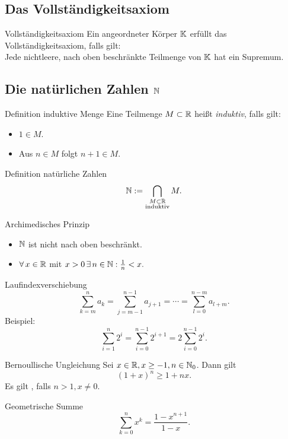 \documentclass[main.tex]{subfiles}
\begin{document}
\subsection*{Das Vollständigkeitsaxiom}
\begin{karte}{Vollständigkeitsaxiom}
    Ein angeordneter Körper \( \mathbb{K} \) erfüllt das Vollständigkeitsaxiom, falls gilt:\\
    Jede nichtleere, nach oben beschränkte Teilmenge von \( \mathbb{K} \) hat ein Supremum.
\end{karte}
\subsection*{Die natürlichen Zahlen \( \mathbb{N} \)}
\begin{karte}{Definition induktive Menge}
    Eine Teilmenge \( M \subset \mathbb{R} \) heißt \textit{induktiv}, falls gilt:
    \begin{itemize}
        \item \( 1 \in M \).
        \item Aus \( n \in M \) folgt \( n + 1 \in M \).
    \end{itemize}
\end{karte}
\begin{karte}{Definition natürliche Zahlen}
    \[ \mathbb{N} := \bigcap_{\substack{M\subset \mathbb{R} \\ \text{induktiv}}} M. \]
\end{karte}
\begin{karte}{Archimedisches Prinzip}
    \begin{itemize}
        \item \( \mathbb{N} \) ist nicht nach oben beschränkt.
        \item \( \forall x \in \R \) mit \( x > 0 \, \exists n \in \N: \frac{1}{n} < x. \)
    \end{itemize}
\end{karte}
\begin{karte}{Laufindexverschiebung}
    \[ \sum_{k=m}^n a_k = \sum_{j=m-1}^{n-1} a_{j+1} = \cdots = \sum_{l=0}^{n-m} a_{l+m}. \]
    Beispiel:
    \[ \sum_{i=1}^n 2^i = \sum_{i=0}^{n-1} 2^{i+1} = 2\sum_{i=0}^{n-1} 2^i. \]
\end{karte}
\begin{karte}{Bernoullische Ungleichung}
    Sei \( x \in \mathbb{R}, x \geq -1, n \in \mathbb{N}_0 \). Dann gilt 
    \[ {(1+x)}^n \geq 1 + nx. \]
    Es gilt \gqq{\(>\)}, falls \(n > 1, x \neq 0\).
\end{karte}
\begin{karte}{Geometrische Summe}
    \[ \sum_{k=0}^n x^k = \frac{1 - x^{n+1}}{1 - x}. \]
\end{karte}
\end{document}
